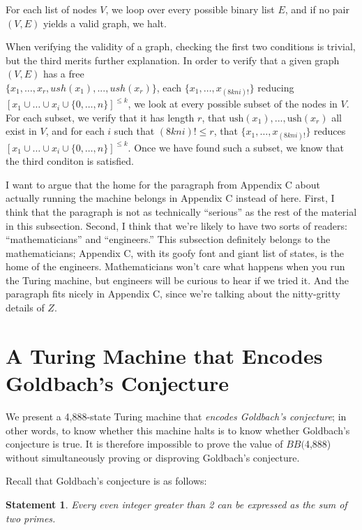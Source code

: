 \documentclass[11pt]{article}
\newtheorem{statement}{Statement}
\newcommand{\gbstatenumstate}{4,888-state }
\newcommand{\bbgbstatenum}{$BB($4,888) }
\begin{document}
For each list of nodes $V$, we loop over every possible binary list $E$, and if no pair $(V, E)$ yields a valid graph, we halt. 

When verifying the validity of a graph, checking the first two conditions is trivial, but the third merits further explanation. In order to verify that a given graph $(V, E)$ has a free \\ $\{x_1,\dots,x_r, ush(x_1),...,ush(x_r)\}$, each  $\{x_1, \dots, x_{(8kni)!}\}$ reducing $[x_1 \cup \dots \cup x_i \cup \{0,\dots,n\}]^{\le k}$, we look at every possible subset of the nodes in $V$. For each subset, we verify that it has length $r$, that $\textrm{ush}(x_1),...,\textrm{ush}(x_r)$ all exist in $V$, and for each $i$ such that $(8kni)! \le r$, that $\{x_1, \dots, x_{(8kni)!}\}$ reduces $[x_1 \cup \dots \cup x_i \cup \{0,\dots,n\}]^{\le k}$. Once we have found such a subset, we know that the third conditon is satisfied.

{\color{red} I want to argue that the home for the paragraph from Appendix C about actually running the machine belongs in Appendix C instead of here. First, I think that the paragraph is not as technically ``serious'' as the rest of the material in this subsection. Second, I think that we're likely to have two sorts of readers: ``mathematicians'' and ``engineers.'' This subsection definitely belongs to the mathematicians; Appendix C, with its goofy font and giant list of states, is the home of the engineers. Mathematicians won't care what happens when you run the Turing machine, but engineers will be curious to hear if we tried it. And the paragraph fits nicely in Appendix C, since we're talking about the nitty-gritty details of $Z$.}

\section{A Turing Machine that Encodes Goldbach's Conjecture} \label{sec:g}

We present a \gbstatenumstate Turing machine that \emph{encodes Goldbach's conjecture}; in other words, to know whether this machine halts is to know whether Goldbach's conjecture is true. It is therefore impossible to prove the value of \bbgbstatenum without simultaneously proving or disproving Goldbach's conjecture.

Recall that Goldbach's conjecture is as follows:

\begin{statement}
\emph{Every even integer greater than 2 can be expressed as the sum of two primes.}
\label{goldbachstatement}
\end{statement}
\end{document}
